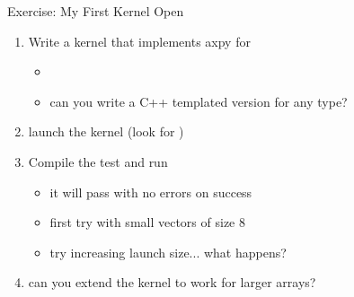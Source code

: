 \documentclass[aspectratio=43]{beamer}
\newcommand{\axpy}{{\ttfamily axpy}\xspace}
\begin{document}
\begin{frame}[fragile]{Exercise: My First Kernel}
    Open 

    \begin{enumerate}
        \item Write a kernel that implements \axpy for 
        \begin{itemize}
            \item {}
            \item \extra can you write a C++ templated version for any type?
        \end{itemize}

    \item launch the kernel (look for )
        \item Compile the test and run
        \begin{itemize}
            \item it will pass with no errors on success
            \item first try with small vectors of size 8
            \item try increasing launch size... what happens?
        \end{itemize}
        \item \extra can you extend the kernel to work for larger arrays?
    \end{enumerate}
\end{frame}



\end{document}
